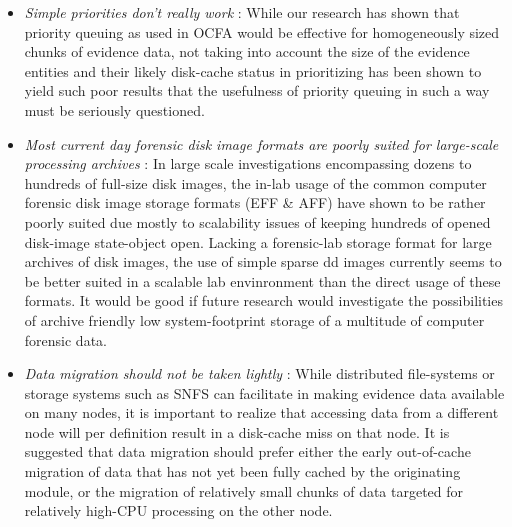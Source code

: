 \begin{itemize}
\item \emph{Simple priorities don't really work} : While our research has shown that priority queuing as used in OCFA would be effective for homogeneously sized chunks of evidence data, not taking into account the size of the evidence entities and their likely disk-cache status in prioritizing has been shown to yield such poor results that the usefulness of priority queuing in such a way must be seriously questioned. 
\item \emph{Most current day forensic disk image formats are poorly suited for large-scale processing archives} : In large scale investigations encompassing dozens to hundreds of full-size disk images, the in-lab usage of the common computer forensic disk image storage formats (EFF \& AFF) have shown to be rather poorly suited due mostly to scalability issues of keeping hundreds of opened disk-image state-object open. Lacking a forensic-lab storage format for large archives of disk images, the use of simple sparse dd images currently seems to be better suited in a scalable lab envinronment than the direct usage of these formats. It would be good if future research would investigate the possibilities of archive friendly low system-footprint storage of a multitude of computer forensic data. 
\item \emph{Data migration should not be taken lightly} : While distributed file-systems or storage systems such as SNFS can facilitate in making evidence data available on many nodes, it is important to realize that accessing data from a different node will per definition result in a disk-cache miss on that node. It is suggested that data migration should prefer either the early out-of-cache migration of data that has not yet been fully cached by the originating module, or the migration of relatively small chunks of data targeted for relatively high-CPU processing on the other node. 

\end{itemize}
